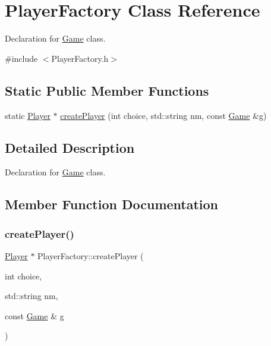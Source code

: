 \hypertarget{class_player_factory}{}\section{Player\+Factory Class Reference}
\label{class_player_factory}


Declaration for \mbox{\hyperlink{class_game}{Game}} class.  




{\ttfamily \#include $<$Player\+Factory.\+h$>$}

\subsection*{Static Public Member Functions}
\begin{DoxyCompactItemize}
\item 
static \mbox{\hyperlink{class_player}{Player}} $\ast$ \mbox{\hyperlink{class_player_factory_ab7e06b498ce86f1e81296914f7c0e712}{create\+Player}} (int choice, std\+::string nm, const \mbox{\hyperlink{class_game}{Game}} \&g)
\end{DoxyCompactItemize}


\subsection{Detailed Description}
Declaration for \mbox{\hyperlink{class_game}{Game}} class. 

\subsection{Member Function Documentation}
\mbox{\label{class_player_factory_ab7e06b498ce86f1e81296914f7c0e712}} 
\subsubsection{\texorpdfstring{create\+Player()}{createPlayer()}}
{\footnotesize\ttfamily \mbox{\hyperlink{class_player}{Player}} $\ast$ Player\+Factory\+::create\+Player (\begin{DoxyParamCaption}\item[{int}]{choice,  }\item[{std\+::string}]{nm,  }\item[{const \mbox{\hyperlink{class_game}{Game}} \&}]{g }\end{DoxyParamCaption})\hspace{0.3cm}{\ttfamily [static]}}

